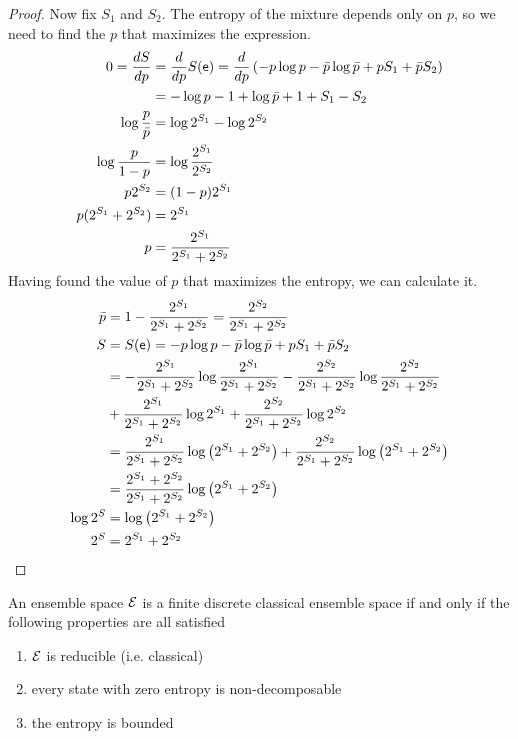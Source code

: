 \begin{proof}
	Now fix $S_1$ and $S_2$. The entropy of the mixture depends only on $p$, so we need to find the $p$ that maximizes the expression.
	\begin{equation}
		\begin{aligned}
			0 = \frac{dS}{dp} &= \frac{d}{dp} S(\mathsf{e}) =\frac{d}{dp} \left( - p \log p - \bar{p} \log \bar{p} + p S_1 + \bar{p} S_2 \right) \\
			&= - \log p - 1 + \log \bar{p} + 1 + S_1 - S_2 \\
			\log \frac{p}{\bar{p}} &= \log 2^{S_1} - \log 2^{S_2} \\
			\log \frac{p}{1-p} &= \log \frac{2^{S_1}}{2^{S_2}}  \\
			p 2^{S_2} &= (1-p) 2^{S_1}  \\
			p (2^{S_1} + 2^{S_2}) &= 2^{S_1}  \\
			p &= \frac{2^{S_1}}{2^{S_1} + 2^{S_2}}  \\
		\end{aligned}
	\end{equation}
	Having found the value of $p$ that maximizes the entropy, we can calculate it.
	\begin{equation}
	\begin{aligned}
		\bar{p} &= 1- \frac{2^{S_1}}{2^{S_1} + 2^{S_2}} = \frac{2^{S_2}}{2^{S_1} + 2^{S_2}} \\
		S &= S(\mathsf{e}) = - p \log p - \bar{p} \log \bar{p} + p S_1 + \bar{p} S_2  \\
		&= - \frac{2^{S_1}}{2^{S_1} + 2^{S_2}} \log \frac{2^{S_1}}{2^{S_1} + 2^{S_2}} - \frac{2^{S_2}}{2^{S_1} + 2^{S_2}} \log \frac{2^{S_2}}{2^{S_1} + 2^{S_2}} \\
		&+ \frac{2^{S_1}}{2^{S_1} + 2^{S_2}} \log 2^{S_1} + \frac{2^{S_2}}{2^{S_1} + 2^{S_2}} \log 2^{S_2} \\
		&= \frac{2^{S_1}}{2^{S_1} + 2^{S_2}} \log \left( 2^{S_1} + 2^{S_2} \right) + \frac{2^{S_2}}{2^{S_1} + 2^{S_2}} \log \left( 2^{S_1} + 2^{S_2} \right) \\
		&= \frac{2^{S_1} + 2^{S_2}}{2^{S_1} + 2^{S_2}} \log \left( 2^{S_1} + 2^{S_2} \right) \\
		\log 2^S &= \log \left( 2^{S_1} + 2^{S_2} \right) \\
		2^S &=  2^{S_1} + 2^{S_2}  \\
	\end{aligned}
\end{equation}
	
\end{proof}


\begin{conj}
	An ensemble space $\mathcal{E}$ is a finite discrete classical ensemble space if and only if the following properties are all satisfied
	\begin{enumerate}
		\item $\mathcal{E}$ is reducible (i.e. classical)
		\item every state with zero entropy is non-decomposable
		\item the entropy is bounded
	\end{enumerate}
\end{conj}

